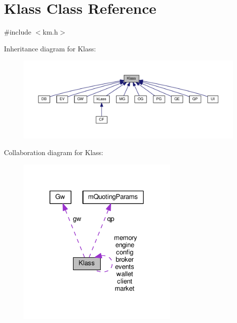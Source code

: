 \hypertarget{class_k_1_1_klass}{}\section{Klass Class Reference}
\label{class_k_1_1_klass}


{\ttfamily \#include $<$km.\+h$>$}



Inheritance diagram for Klass\+:
\nopagebreak
\begin{figure}[H]
\begin{center}
\leavevmode
\includegraphics[width=350pt]{class_k_1_1_klass__inherit__graph}
\end{center}
\end{figure}


Collaboration diagram for Klass\+:
\nopagebreak
\begin{figure}[H]
\begin{center}
\leavevmode
\includegraphics[width=222pt]{class_k_1_1_klass__coll__graph}
\end{center}
\end{figure}

